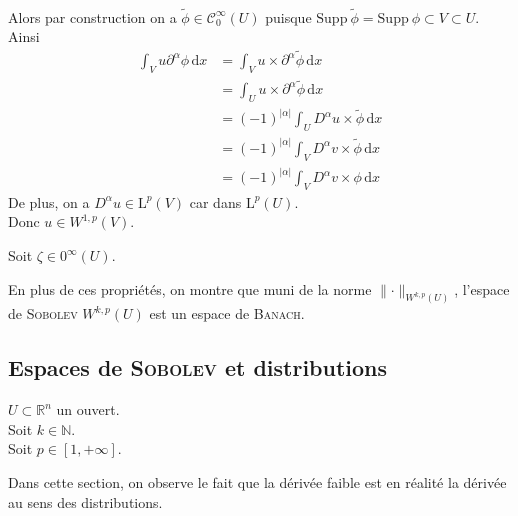\documentclass[../distribution.tex]{subfiles}
\begin{document}
{{\begin{mathlist}
$$\begin{array}{rcl}
						\end{array}
					$$
					Alors par construction on a $\tilde{\phi} \in \mathscr{C}_{0}^{\infty}(U)$ puisque $\mathrm{Supp} \ \tilde{\phi} = \mathrm{Supp} \ \phi \subset V \subset U$. \\
					Ainsi
					$$
						\begin{aligned}
							\int_{V} u \partial^{\alpha} \phi \, \mathrm{d}x & = \int_{V} u \times \partial^{\alpha} \tilde{\phi} \, \mathrm{d}x \\
							& = \int_{U} u \times \partial^{\alpha} \tilde{\phi} \, \mathrm{d}x \\
							& = (-1)^{|\alpha|} \int_{U} D^{\alpha} u \times \tilde{\phi} \, \mathrm{d}x \\
							& = (-1)^{|\alpha|} \int_{V} D^{\alpha} v \times \tilde{\phi} \, \mathrm{d}x \\
							& = (-1)^{|\alpha|} \int_{V} D^{\alpha} v \times \phi \, \mathrm{d}x
						\end{aligned}
					$$
					De plus, on a $D^{\alpha} u \in \mathrm{L}^{p}(V)$ car dans $\mathrm{L}^{p}(U)$. \\
					Donc $u \in W^{1, p}(V)$.
				\item Soit $\zeta \in \mathscr{0}^{\infty}(U)$.
			\end{mathlist}
		}

		En plus de ces propriétés, on montre que muni de la norme $\lVert \cdot \rVert_{W^{k, p}(U)}$, l'espace de \textsc{Sobolev} $W^{k, p}(U)$ est un espace de \textsc{Banach}.

	}

	\subsection{Espaces de \texorpdfstring{\textsc{Sobolev}}{Sobolev} et distributions}{
		\noindent $U \subset \mathbb{R}^{n}$ un ouvert. \\
		\noindent Soit $k \in \mathbb{N}$. \\
		\noindent Soit $p \in [1, +\infty]$.

		\vspace{1em}

		Dans cette section, on observe le fait que la dérivée faible est en réalité la dérivée au sens des distributions.



	}
\end{document}
